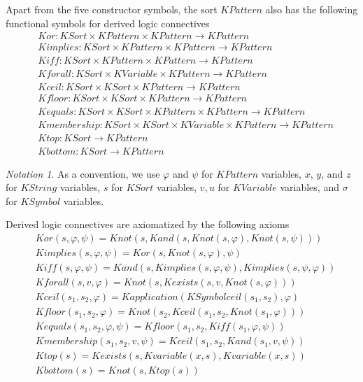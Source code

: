 \documentclass[UTF8,11pt]{article}
\newcounter{thmcounter}
\theoremstyle{plain}
\theoremstyle{definition}
\theoremstyle{remark}
\newtheorem{notation}   [thmcounter]{Notation}
\newcommand{\KString}{\mathit{KString}}
\newcommand{\KSort}{\mathit{KSort}}
\newcommand{\KSymbol}{\mathit{KSymbol}}
\newcommand{\KSymbolceil}{\mathit{KSymbolceil}}
\newcommand{\KVariable}{\mathit{KVariable}}
\newcommand{\KPattern}{\mathit{KPattern}}
\newcommand{\Kvariable}{\mathit{Kvariable}}
\newcommand{\Kand}{\mathit{Kand}}
\newcommand{\Kor}{\mathit{Kor}}
\newcommand{\Kimplies}{\mathit{Kimplies}}
\newcommand{\Kiff}{\mathit{Kiff}}
\newcommand{\Knot}{\mathit{Knot}}
\newcommand{\Kapplication}{\mathit{Kapplication}}
\newcommand{\Kexists}{\mathit{Kexists}}
\newcommand{\Kforall}{\mathit{Kforall}}
\newcommand{\Kequals}{\mathit{Kequals}}
\newcommand{\Kmembership}{\mathit{Kmembership}}
\newcommand{\Ktop}{\mathit{Ktop}}
\newcommand{\Kbottom}{\mathit{Kbottom}}
\newcommand{\Kfloor}{\mathit{Kfloor}}
\newcommand{\Kceil}{\mathit{Kceil}}
\begin{document}
Apart from the five constructor symbols, the sort $\KPattern$ also has
the following functional symbols for derived logic connectives
\begin{align*}
  & \Kor \colon \KSort\times\KPattern \times \KPattern   \to \KPattern
  \\
  & \Kimplies \colon \KSort\times\KPattern \times \KPattern   \to \KPattern
  \\
  & \Kiff \colon \KSort\times\KPattern \times \KPattern   \to \KPattern
  \\
  & \Kforall \colon \KSort\times\KVariable \times \KPattern   \to \KPattern
  \\
  & \Kceil \colon \KSort\times\KSort\times\KPattern     \to \KPattern
  \\
  & \Kfloor \colon \KSort\times\KSort\times\KPattern     \to \KPattern
  \\
  & \Kequals \colon \KSort\times\KSort \times \KPattern \times \KPattern \to 
  \KPattern
  \\
  & \Kmembership \colon \KSort \times \KSort \times \KVariable \times 
  \KPattern  \to \KPattern
  \\
  & \Ktop \colon \KSort \to \KPattern
  \\
  & \Kbottom \colon \KSort \to \KPattern
\end{align*}



\begin{notation}\label{notation:variables-about-KPattern}
	As a convention, we use $\varphi$ and $\psi$ for $\KPattern$ variables, 
	$x$, $y$, and $z$ for $\KString$ variables, $s$ for $\KSort$ variables, $v, 
	u$ for $\KVariable$ variables, and $\sigma$ for $\KSymbol$ variables. 
\end{notation}

Derived logic connectives are axiomatized by the following axioms
\begin{align*}
  & \Kor(s, \varphi, \psi) 
  = \Knot(s, \Kand(s, \Knot(s, \varphi), \Knot(s, \psi)))
  \\
  & \Kimplies(s, \varphi, \psi) 
  = \Kor(s, \Knot(s, \varphi), \psi)
  \\
  & \Kiff(s, \varphi, \psi) 
  = \Kand(s, \Kimplies(s, \varphi, \psi), \Kimplies(s, \psi, \varphi))
  \\
  & \Kforall(s, v, \varphi) 
  = \Knot(s, \Kexists(s, v, \Knot(s, \varphi)))
  \\
  & \Kceil(s_1, s_2, \varphi) =
    \Kapplication(\KSymbolceil(s_1, s_2), \varphi)
  \\
  & \Kfloor(s_1, s_2, \varphi) 
  = \Knot(s_2, \Kceil(s_1, s_2, \Knot(s_1, \varphi)))
  \\
  & \Kequals(s_1, s_2, \varphi, \psi) 
  = \Kfloor(s_1, s_2, \Kiff(s_1, \varphi, \psi))
  \\
  & \Kmembership(s_1, s_2, v, \psi) 
  = \Kceil(s_1, s_2, \Kand(s_1, v, \psi))
  \\
  & \Ktop(s) = \Kexists(s, \Kvariable(x, s), \Kvariable(x, s))
  \\
  & \Kbottom(s) = \Knot(s, \Ktop(s))
\end{align*}
\end{document}
